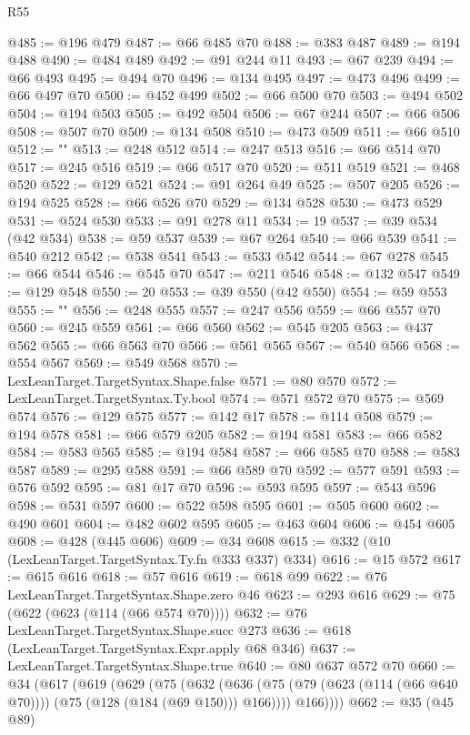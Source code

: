 \begin{lexlean}{R55}
\begin{coremodule}
{{{{{{{{{{{{{{{{{{{{{{{{{{{{{{{{{{{{{{{{{{{{{{{{{{{{{{{{{{{{{{{{{{{{{{{{{{{{{{{{@485 := @196 @479
@487 := @66 @485 @70
@488 := @383 @487
@489 := @194 @488
@490 := @484 @489
@492 := @91 @244 @11
@493 := @67 @239
@494 := @66 @493
@495 := @494 @70
@496 := @134 @495
@497 := @473 @496
@499 := @66 @497 @70
@500 := @452 @499
@502 := @66 @500 @70
@503 := @494 @502
@504 := @194 @503
@505 := @492 @504
@506 := @67 @244
@507 := @66 @506
@508 := @507 @70
@509 := @134 @508
@510 := @473 @509
@511 := @66 @510
@512 := "{"
@513 := @248 @512
@514 := @247 @513
@516 := @66 @514 @70
@517 := @245 @516
@519 := @66 @517 @70
@520 := @511 @519
@521 := @468 @520
@522 := @129 @521
@524 := @91 @264 @49
@525 := @507 @205
@526 := @194 @525
@528 := @66 @526 @70
@529 := @134 @528
@530 := @473 @529
@531 := @524 @530
@533 := @91 @278 @11
@534 := 19
@537 := @39 @534 (@42 @534)
@538 := @59 @537
@539 := @67 @264
@540 := @66 @539
@541 := @540 @212
@542 := @538 @541
@543 := @533 @542
@544 := @67 @278
@545 := @66 @544
@546 := @545 @70
@547 := @211 @546
@548 := @132 @547
@549 := @129 @548
@550 := 20
@553 := @39 @550 (@42 @550)
@554 := @59 @553
@555 := "}"
@556 := @248 @555
@557 := @247 @556
@559 := @66 @557 @70
@560 := @245 @559
@561 := @66 @560
@562 := @545 @205
@563 := @437 @562
@565 := @66 @563 @70
@566 := @561 @565
@567 := @540 @566
@568 := @554 @567
@569 := @549 @568
@570 := LexLeanTarget.TargetSyntax.Shape.false
@571 := @80 @570
@572 := LexLeanTarget.TargetSyntax.Ty.bool
@574 := @571 @572 @70
@575 := @569 @574
@576 := @129 @575
@577 := @142 @17
@578 := @114 @508
@579 := @194 @578
@581 := @66 @579 @205
@582 := @194 @581
@583 := @66 @582
@584 := @583 @565
@585 := @194 @584
@587 := @66 @585 @70
@588 := @583 @587
@589 := @295 @588
@591 := @66 @589 @70
@592 := @577 @591
@593 := @576 @592
@595 := @81 @17 @70
@596 := @593 @595
@597 := @543 @596
@598 := @531 @597
@600 := @522 @598 @595
@601 := @505 @600
@602 := @490 @601
@604 := @482 @602 @595
@605 := @463 @604
@606 := @454 @605
@608 := @428 (@445 @606)
@609 := @34 @608
@615 := @332 (@10 (LexLeanTarget.TargetSyntax.Ty.fn @333 @337) @334)
@616 := @15 @572
@617 := @615 @616
@618 := @57 @616
@619 := @618 @99
@622 := @76 LexLeanTarget.TargetSyntax.Shape.zero @46
@623 := @293 @616
@629 := @75 (@622 (@623 (@114 (@66 @574 @70))))
@632 := @76 LexLeanTarget.TargetSyntax.Shape.succ @273
@636 := @618 (LexLeanTarget.TargetSyntax.Expr.apply @68 @346)
@637 := LexLeanTarget.TargetSyntax.Shape.true
@640 := @80 @637 @572 @70
@660 := @34
    (@617
      (@619
        (@629
          (@75
            (@632
              (@636 (@75 (@79 (@623 (@114 (@66 @640 @70)))) (@75 (@128 (@184 (@69 @150))) @166))))
            @166))))
@662 := @35 (@45 @89)
}}}}}}}}}}}}}}}}}}}}}}}}}}}}}}}}}}}}}}}}}}}}}}}}}}}}}}}}}}}}}}}}}}}}}}}}}}}}}}}}
\end{coremodule}
\end{lexlean}
